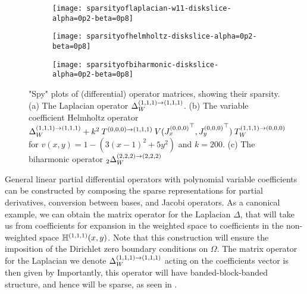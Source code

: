 \begin{figure}[tp]
	\centering %
	\begin{subfigure}{0.5\textwidth}
		\centerline{\texttt{[image: sparsityoflaplacian-w11-diskslice-alpha=0p2-beta=0p8]}}
		\centering
		\caption{}
	\end{subfigure}\hfil %
	\begin{subfigure}{0.5\textwidth}
		\centerline{\texttt{[image: sparsityofhelmholtz-diskslice-alpha=0p2-beta=0p8]}}
		\centering
		\caption{}
	\end{subfigure}\hfil %

	\medskip
	\begin{subfigure}{0.5\textwidth}
		\centerline{\texttt{[image: sparsityofbiharmonic-diskslice-alpha=0p2-beta=0p8]}}
		\centering
		\caption{}
	\end{subfigure}\hfil %
    	\caption{"Spy" plots of (differential) operator matrices, showing their sparsity. (a) The Laplacian operator $\Delta_W^{(1,1,1)\to(1,1,1)}$. (b) The variable coefficient Helmholtz operator $\Delta_W^{(1,1,1)\to(1,1,1)} + k^2 \: T^{(0,0,0)\to(1,1,1)} \: V({J_x^{(0,0,0)}}^\top, {J_y^{(0,0,0)}}^\top) \: T_W^{(1,1,1)\to(0,0,0)}$ for $v(x,y) = 1 - (3(x-1)^2 + 5y^2)$ and $k = 200$. (c) The biharmonic operator $_2\Delta_W^{(2,2,2)\to(2,2,2)}$}
	\label{fig:ds:sparsity}
\end{figure}

General linear partial differential operators with polynomial variable coefficients can be constructed by composing the sparse representations for partial derivatives, conversion between bases, and Jacobi operators. As a canonical example, we can obtain the matrix operator for the Laplacian  $\Delta$, that will take us from coefficients for expansion in the weighted space
to coefficients in the non-weighted space ${\mathbb{H}^{(1,1,1)}}(x,y)$. Note that this construction will ensure the imposition of the Dirichlet zero boundary conditions on $\Omega$. The matrix operator for the Laplacian we denote $\Delta_W^{(1,1,1)\to(1,1,1)}$ acting on the coefficients vector is then given by
Importantly, this operator will have banded-block-banded structure, and hence will be sparse, as seen in .

